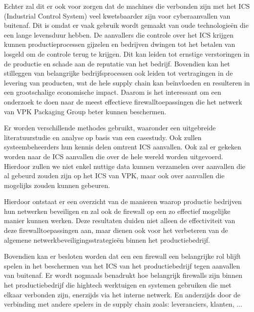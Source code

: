 Echter zal dit er ook voor zorgen dat de machines die verbonden zijn met het ICS (Industrial Control System) veel kwetsbaarder zijn voor cyberaanvallen van buitenaf. Dit is omdat er vaak gebruik wordt gemaakt van oude technologieën die een lange levensduur hebben. De aanvallers die controle over het ICS krijgen kunnen productieprocessen gijzelen en bedrijven dwingen tot het betalen van losgeld om de controle terug te krijgen. Dit kan leiden tot ernstige verstoringen in de productie en schade aan de reputatie van het bedrijf. Bovendien kan het stilleggen van belangrijke bedrijfsprocessen ook leiden tot vertragingen in de levering van producten, wat de hele supply chain kan beïnvloeden en resulteren in een grootschalige economische impact. Daarom is het interessant om een onderzoek te doen naar de meest effectieve firewalltoepassingen die het netwerk van VPK Packaging Group beter kunnen beschermen. 

Er worden verschillende methodes gebruikt, waaronder een uitgebreide literatuurstudie en analyse op basis van een casestudy. Ook zullen systeembeheerders hun kennis delen omtrent ICS aanvallen. Ook zal er gekeken worden naar de ICS aanvallen die over de hele wereld worden uitgevoerd. Hierdoor zullen we niet enkel nuttige data kunnen verzamelen over aanvallen die al gebeurd zouden zijn op het ICS van VPK, maar ook over aanvallen die mogelijks zouden kunnen gebeuren.

Hierdoor ontstaat er een overzicht van de manieren waarop productie bedrijven hun netwerken beveiligen en zal ook de firewall op een zo effectief mogelijke manier kunnen werken. Deze resultaten duiden niet alleen de effectiviteit van deze firewalltoepassingen aan, maar dienen ook voor het verbeteren van de algemene netwerkbeveiligingsstrategieën binnen het productiebedrijf.

Bovendien kan er besloten worden dat een een firewall een belangrijke rol blijft spelen in het beschermen van het ICS van het productiebedrijf tegen aanvallen van buitenaf. Er wordt nogmaals benadrukt hoe belangrijk firewalls zijn binnen het productiebedrijf die hightech werktuigen en systemen gebruiken die met elkaar verbonden zijn, enerzijds via het interne netwerk. En anderzijds door de verbinding met andere spelers in de supply chain zoals: leveranciers, klanten, ...
